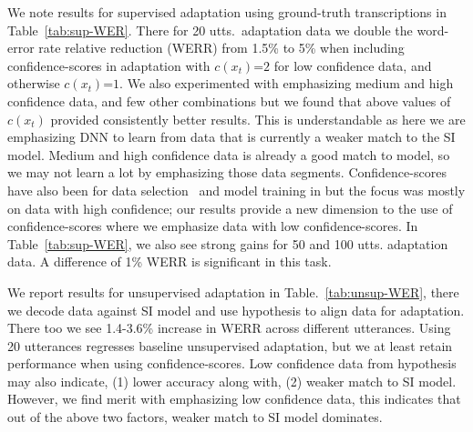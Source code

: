 We note results for supervised adaptation using ground-truth transcriptions in Table~\ref{tab:sup-WER}. There for 20 utts.~adaptation data we double the word-error rate relative reduction (WERR) from 1.5\% to 5\% when including confidence-scores in adaptation with $c(x_t)$=$2$ for low confidence data, and otherwise $c(x_t)$=$1$. We also experimented with emphasizing medium and high confidence data, and few other combinations but we found that above values of $c(x_t)$ provided consistently better results. This is understandable as here we are emphasizing DNN to learn from data that is currently a weaker match to the SI model. Medium and high confidence data is already a good match to model, so we may not learn a lot by emphasizing those data segments. Confidence-scores have also been for data selection~\cite{zhang2014semi} and model training in \cite{gollan2008confidence} but the focus was mostly on data with high confidence; our results provide a new dimension to the use of confidence-scores where we emphasize data with low confidence-scores. In Table~\ref{tab:sup-WER}, we also see strong gains for 50 and 100 utts. adaptation data. A difference of 1\% WERR is significant in this task. 

We report results for unsupervised adaptation in Table.~\ref{tab:unsup-WER}, there we decode data against SI model and use hypothesis to align data for adaptation. There too we see 1.4-3.6\% increase in WERR across different utterances. Using 20 utterances regresses baseline unsupervised adaptation, but we at least retain performance when using confidence-scores. Low confidence data from hypothesis may also indicate, (1) lower accuracy along with, (2) weaker match to SI model. However, we find merit with emphasizing low confidence data, this indicates that out of the above two factors, weaker match to SI model dominates.






